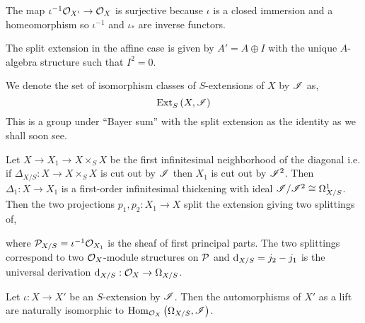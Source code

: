\documentclass[12pt]{article}
\begin{document}
\begin{rmk}
The map $\iota^{-1} \mathcal{O}_{X'} \to \mathcal{O}_{X}$ is surjective because $\iota$ is a closed immersion and a homeomorphism so $\iota^{-1}$ and $\iota_*$ are inverse functors.
\end{rmk}

\begin{rmk}
The split extension in the affine case is given by $A' = A \oplus I$ with the unique $A$-algebra structure such that $I^2 = 0$.
\end{rmk}

\begin{defn}
We denote the set of isomorphism classes of $S$-extensions of $X$ by $\mathscr{I}$ as,
\[ \mathrm{Ext}^{}_{S} \left( X, \mathscr{I} \right) \]
This is a group under ``Bayer sum'' with the split extension as the identity as we shall soon see.
\end{defn}

\begin{example}
Let $X \to X_1 \to X \times_S X$ be the first infinitesimal neighborhood of the diagonal i.e. if $\Delta_{X/S} : X \to X \times_S X$ is cut out by $\mathscr{I}$ then $X_1$ is cut out by $\mathscr{I}^2$. Then $\Delta_1 : X \to X_1$ is a first-order infinitesimal thickening with ideal $\mathscr{I}/\mathscr{I}^2 \cong \Omega^1_{X/S}$. Then the two projections $p_1, p_2 : X_1 \to X$ split the extension giving two splittings of,
\begin{center}
\end{center}
where $\mathcal{P}_{X/S} = \iota^{-1} \mathcal{O}_{X_1}$ is the sheaf of first principal parts. The two splittings correspond to two $\mathcal{O}_{X}$-module structures on $\mathcal{P}$ and $\mathrm{d}_{X/S} = j_2 - j_1$ is the universal derivation $\mathrm{d}_{X/S} : \mathcal{O}_{X} \to \Omega_{X/S}$.
\end{example}

\begin{prop}
Let $\iota : X \to X'$ be an $S$-extension by $\mathscr{I}$. Then the automorphisms of $X'$ as a lift are naturally isomorphic to $\mathrm{Hom}_{\mathcal{O}_{X}} \left( \Omega_{X/S}, \mathscr{I} \right)$.
\end{prop}
\end{document}
